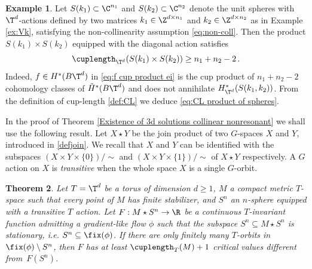 \documentclass[11pt,a4paper,reqno]{article}
\numberwithin{equation}{section}
\newtheorem{theorem}{Theorem}[section]
\theoremstyle{definition}
\newtheorem{example}[theorem]{Example}
\begin{document}
\begin{example}
    \label{cup-length of two spheres}
   Let $S(k_1)\subset \C^{n_1}$ and $S(k_2)\subset \C^{n_2}$ denote the unit spheres 
   with $\T^d$-actions defined by two matrices $k_1\in \Z^{d\times n_1}$ and $k_2\in \Z^{d\times n_2}$ as in Example \ref{ex:Vk},  satisfying 
the non-collinearity assumption \eqref{eq:non-coll}. Then the product  $ S(k_1)\times S(k_2)$ 
equipped with the diagonal action satisfies 
    \begin{equation} \label{eq:CL product of spheres}
        \cuplength_{\T^d}(S(k_1)\times S(k_2))\geq n_1+n_2-2\, . 
    \end{equation}
Indeed,  
$f\in H^*(B\T^d)$ in  \eqref{eq:f cup product ei} is the cup product of $n_1+n_2-2$ cohomology classes of $\tilde H^*(B\T^d)$ and does not annihilate $H^*_{\T^d}(S(k_1,k_2))$.
    From the definition of cup-length \eqref{def:CL} we deduce \eqref{eq:CL product of spheres}.
\end{example}

In the proof of Theorem  \ref{Existence of 3d solutions collinear nonresonant} we shall use  the following 
result. 
Let $X\star Y$ be  the join product  of two $G$-spaces $X$ and $Y$, introduced in 
\eqref{defjoin}. 
We recall that $X$ and $Y$ can be identified with the subspaces $ (X\times Y\times \{0\})/ \sim $ and $ ( X\times Y\times\{1\} ) / \sim $ of $X \star Y$ respectively. A $G$ action on $X$ is \emph{transitive} when the whole space $X$ is a single $G$-orbit.

\begin{theorem}\label{teo:ast}
Let $T=\T^d$ be a torus of dimension $d\geq1$, $M$ a compact metric $ T $-space 
such that every point of $M$ has finite stabilizer, and $S^n$ an $n$-sphere equipped with a  %
transitive $T$ action. Let $F:M \star S^n\to\R$ be a continuous $T$-invariant function admitting a gradient-like flow $\phi$ such that the subspace $S^n\subseteq M\star S^n$ is stationary, i.e.
$ S^n\subseteq\fix(\phi) $. 
If there are only finitely many  $T$-orbits in $\fix(\phi)\setminus S^n$, then $F$ has at least $\cuplength_{T}(M)+1$ \emph{critical values} different from~$F(S^n)$.
\end{theorem}
\end{document}
